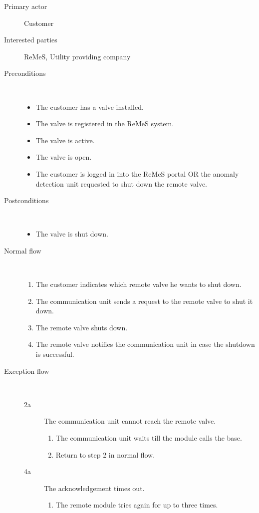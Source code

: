 \begin{description}
	\item[Primary actor] Customer
	\item[Interested parties] ReMeS, Utility providing company
	\item[Preconditions] \ 
	\begin{itemize}
		\item The customer has a valve installed.
		\item The valve is registered in the ReMeS system.
		\item The valve is active.
		\item The valve is open.
		\item The customer is logged in into the ReMeS portal OR the anomaly detection
		unit requested to shut down the remote valve.
	\end{itemize}
	\item[Postconditions] \ 
	\begin{itemize}
		\item The valve is shut down.
	\end{itemize}
	\item[Normal flow] \ 
	\begin{enumerate}
	  	\item The customer indicates which remote valve he wants to shut down.
	  	\item The communication unit sends a request to the remote valve to shut it
	  	down.
	  	\item The remote valve shuts down.
	  	\item The remote valve notifies the communication unit in case the
	  	shutdown is successful.
	\end{enumerate}
	\item[Exception flow] \ 
	\begin{description}
		\item[2a] The communication unit cannot reach the remote valve.
		\begin{enumerate}
		  \item The communication unit waits till the module calls the base.
		  \item Return to step 2 in normal flow.
		\end{enumerate}
		\item[4a] The acknowledgement times out.
		\begin{enumerate}
			\item The remote module tries again for up to three times.
		\end{enumerate}
	\end{description}
\end{description}